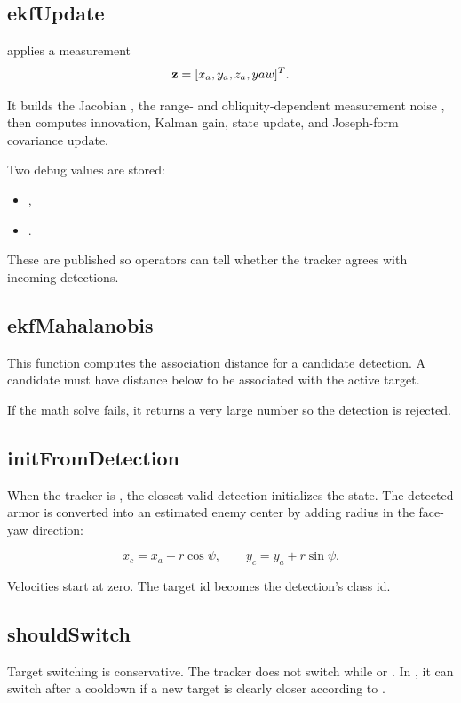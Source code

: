 \subsection{ekfUpdate}

 applies a measurement
\[
\mathbf{z} = [x_a, y_a, z_a, yaw]^T.
\]

It builds the Jacobian , the range- and obliquity-dependent
measurement noise , then computes innovation, Kalman gain, state
update, and Joseph-form covariance update.

Two debug values are stored:

\begin{itemize}
  \item {},
  \item {}.
\end{itemize}

These are published so operators can tell whether the tracker agrees with
incoming detections.

\subsection{ekfMahalanobis}

This function computes the association distance for a candidate detection. A
candidate must have distance below  to be associated
with the active target.

If the math solve fails, it returns a very large number so the detection is
rejected.

\subsection{initFromDetection}

When the tracker is , the closest valid detection initializes the
state. The detected armor is converted into an estimated enemy center by
adding radius in the face-yaw direction:

\[
x_c = x_a + r\cos\psi,\qquad y_c = y_a + r\sin\psi.
\]

Velocities start at zero. The target id becomes the detection's class id.

\subsection{shouldSwitch}

Target switching is conservative. The tracker does not switch while
 or . In , it can switch after a
cooldown if a new target is clearly closer according to
.

